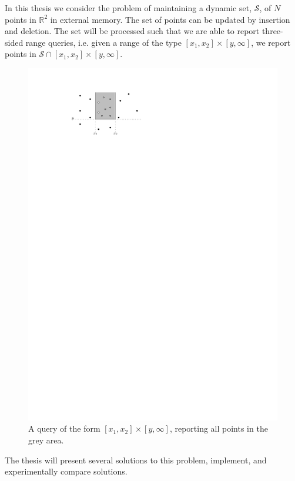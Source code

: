 \documentclass[twoside,11pt,openright]{report}
\begin{document}
In this thesis we consider the problem of maintaining a dynamic set, $\mathcal{S}$, of $N$ points in $\mathbb{R}^2$ in external memory. The set of points can be updated by insertion and deletion. The set will be processed such that we are able to report three-sided range queries, i.e. given a range of the type $[x_1,x_2] \times [y,\infty]$, we report points in $\mathcal{S} \cap [x_1,x_2] \times [y,\infty]$.

\begin{figure}[h]
	\centering
	\includegraphics[scale=1]{../figures/three-sided-query}
	\caption{A query of the form $[x_1,x_2] \times [y,\infty]$, reporting all points in the grey area.}
	\label{fig:three-sided-query}
\end{figure}
 
The thesis will present several solutions to this problem, implement, and experimentally compare solutions.
\end{document}
